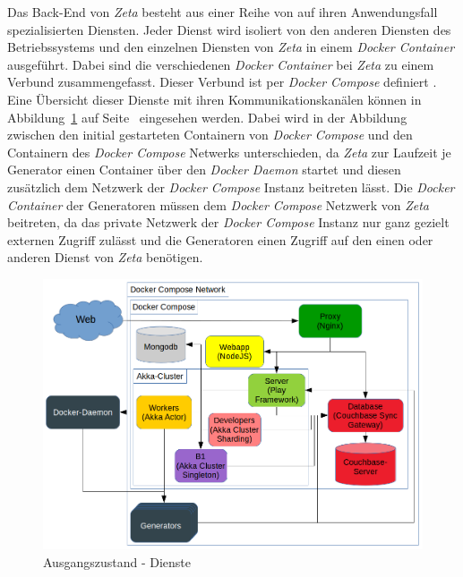Das Back-End von \textit{Zeta} besteht aus einer Reihe von auf ihren Anwendungsfall spezialisierten Diensten. Jeder Dienst wird isoliert von den anderen Diensten des Betriebssystems und den einzelnen Diensten von \textit{Zeta} in einem \textit{Docker Container} ausgeführt. Dabei sind die verschiedenen \textit{Docker Container} bei \textit{Zeta} zu einem Verbund zusammengefasst. Dieser Verbund ist per \textit{Docker Compose} definiert \cite{zeta_docker_compose}. Eine Übersicht dieser Dienste mit ihren Kommunikationskanälen können in Abbildung~\ref{fig:ZETA_ARCH_OLD} auf Seite~\pageref{fig:ZETA_ARCH_OLD} eingesehen werden. Dabei wird in der Abbildung zwischen den initial gestarteten Containern von \textit{Docker Compose} und den Containern des \textit{Docker Compose} Netwerks unterschieden, da \textit{Zeta} zur Laufzeit je Generator einen Container über den \textit{Docker Daemon} startet und diesen zusätzlich dem Netzwerk der \textit{Docker Compose} Instanz beitreten lässt. Die \textit{Docker Container} der Generatoren müssen dem \textit{Docker Compose} Netzwerk von \textit{Zeta} beitreten, da das private Netzwerk der \textit{Docker Compose} Instanz nur ganz gezielt externen Zugriff zulässt und die Generatoren einen Zugriff auf den einen oder anderen Dienst von \textit{Zeta} benötigen.

\begin{figure}
    \centering
    \includegraphics[width=5in]{figures/docker-compose-before.png}
    \caption{Ausgangszustand - Dienste}
    \label{fig:ZETA_ARCH_OLD}
\end{figure}

